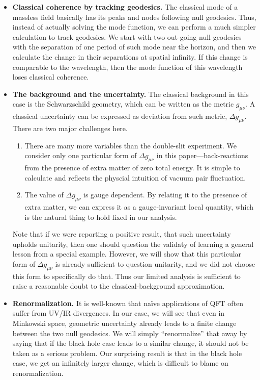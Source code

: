 \documentclass[aps,showpacs,onecolumn,floats,prd,superscriptaddress,nofootinbib]{revtex4-1}
\begin{document}
\begin{itemize}
\item {\bf Classical coherence by tracking geodesics.} The classical mode of a massless field basically has its peaks and nodes following null geodesics.
Thus, instead of actually solving the mode function, we can perform a much simpler calculation to track geodesics.
We start with two out-going null geodesics with the separation of one period of such mode near the horizon, and then we calculate the change in their separations at spatial infinity.
If this change is comparable to the wavelength, then the mode function of this wavelength loses classical coherence.
\item {\bf The background and the uncertainty.} The classical background in this case is the Schwarzschild geometry, which can be written as the metric $g_{\mu\nu}$. 
A classical uncertainty can be expressed as deviation from such metric, $\Delta g_{\mu\nu}$. 
There are two major challenges here.
\begin{enumerate}
\item There are many more variables than the double-slit experiment. 
We consider only one particular form of $\Delta g_{\mu\nu}$ in this paper---back-reactions from the presence of extra matter of zero total energy. 
It is simple to calculate and reflects the physcial intuition of vacuum pair fluctuation.
\item The value of $\Delta g_{\mu\nu}$ is gauge dependent. 
By relating it to the presence of extra matter, we can express it as a gauge-invariant local quantity, which is the natural thing to hold fixed in our analysis.
\end{enumerate}
Note that if we were reporting a positive result, that such uncertainty upholds unitarity, then one should question the validaty of learning a general lesson from a special example. However, we will show that this particular form of $\Delta g_{\mu\nu}$ is already sufficient to question unitarity, and we did not choose this form to specifically do that. Thus our limited analysis is sufficient to raise a reasonable doubt to the classical-background approximation.
\item {\bf Renormalization.} It is well-known that na\"ive applications of QFT often suffer from UV/IR divergences.
In our case, we will see that even in Minkowski space, geometric uncertainty already leads to a finite change between the two null geodesics.
We will simply ``renormalize'' that away by saying that if the black hole case leads to a similar change, it should not be taken as a serious problem.
Our surprising result is that in the black hole case, we get an infinitely larger change, which is difficult to blame on renormalization.
\end{itemize}
\end{document}
